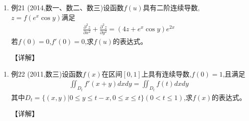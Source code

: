 \documentclass[12pt, a4paper, oneside, UTF8]{ctexbook}
\begin{document}
\begin{remark}
\end{remark}

\begin{enumerate}[label=\arabic*.,start=21]
    \item 例21 (2014,数一、数二、数三)设函数$f(u)$具有二阶连续导数,$z=f(e^x\cos y)$满足
    \begin{align*}
        \frac{\partial^2 z}{\partial x^2}+\frac{\partial^2 z}{\partial y^2}=(4z+e^x\cos y)e^{2x}
    \end{align*}
    若$f(0)=0$,$f'(0)=0$,求$f(u)$的表达式。
    
    \begin{solution}
    【详解】
    \end{solution}
\end{enumerate}

\begin{remark}
\end{remark}

\begin{enumerate}[label=\arabic*.,start=22]
    \item 例22 (2011,数三)设函数$f(x)$在区间$[0,1]$上具有连续导数,$f(0)=1$,且满足
    \begin{align*}
        \iint_{D_t} f'(x+y)dxdy=\iint_{D_t} f(t)dxdy
    \end{align*}
    其中$D_t=\{(x,y)|0\leq y\leq t-x,0\leq x\leq t\}(0<t\leq1)$,求$f(x)$的表达式。
    
    \begin{solution}
    【详解】
    \end{solution}
\end{enumerate}

\ifx\allfiles\undefined
\end{document}
